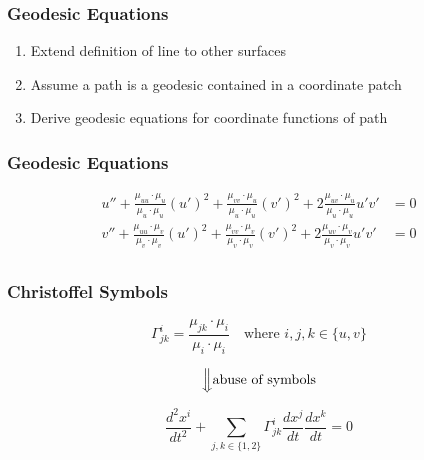\documentclass{beamer}
\begin{document}

\begin{frame}
	
	\frametitle{Geodesic Equations}
	
	\begin{enumerate}
		\item Extend definition of line to other surfaces
		\item Assume a path is a geodesic contained in a coordinate patch
		\item Derive geodesic equations for coordinate functions of path
	\end{enumerate}

\end{frame}


\begin{frame}
	
	\frametitle{Geodesic Equations}
	
	\begin{align*}
		u'' + \frac{\mu_{uu} \cdot \mu_u}{\mu_u \cdot \mu_u} (u')^2 + \frac{\mu_{vv} \cdot \mu_u}{\mu_u \cdot \mu_u} (v')^2 + 2\frac{\mu_{uv} \cdot \mu_u}{\mu_u \cdot \mu_u} u'v' & = 0 \\
		v'' + \frac{\mu_{uu} \cdot \mu_v}{\mu_v \cdot \mu_v} (u')^2 + \frac{\mu_{vv} \cdot \mu_v}{\mu_v \cdot \mu_v} (v')^2 + 2\frac{\mu_{uv} \cdot \mu_v}{\mu_v \cdot \mu_v} u'v' & = 0 \\
	\end{align*}
	
	
\end{frame}


\begin{frame}
	
	\frametitle{Christoffel Symbols}
	
	\begin{equation*} 
		\Gamma^i_{jk} = \frac{\mu_{jk}\cdot\mu_i}{\mu_i\cdot\mu_i} \quad\text{where } i,j,k \in \{u,v\}
	\end{equation*}
	
	$$\Big\Downarrow \text{abuse of symbols}$$
	
	\begin{equation*}
		\frac{d^2x^i}{dt^2} + \sum_{j,k \in \{1,2\}} \Gamma^i_{jk}\frac{dx^j}{dt}\frac{dx^k}{dt} = 0
	\end{equation*}
	
\end{frame}
\end{document}
